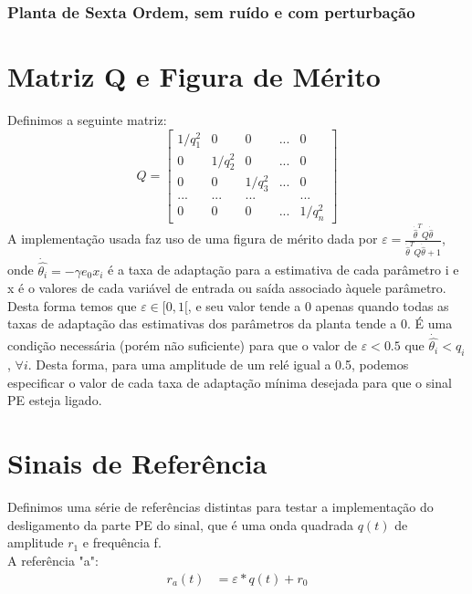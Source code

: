 \documentclass[
	12pt,				%
	openright,			%
	twoside,			%
	a4paper,			%
	english,			%
	french,				%
	spanish,			%
	brazil				%
	]{abntex2}
\begin{document}
\subsubsection{Planta de Sexta Ordem, sem ruído e com perturbação}

\section{Matriz Q e Figura de Mérito}

 Definimos a seguinte matriz: \[
Q=
  \begin{bmatrix}
    1/q_1^2 & 0       &  0       &  ... &  0      \\
    0       & 1/q_2^2 &  0       &  ... &  0      \\
    0       & 0       &  1/q_3^2 &  ... &  0      \\
    ...     & ...     &  ...     &      &  ...    \\
    0       & 0       &  0       &  ... & 1/q_n^2
  \end{bmatrix}
\]
A implementação usada faz uso de uma figura de mérito dada por $\varepsilon = \frac{\dot{\hat{\theta}}^TQ\dot{\hat{\theta}}}{\dot{\hat{\theta}}^TQ\dot{\hat{\theta}}+1}$, onde $\dot{\hat{\theta_i}} = -\gamma e_0 x_i$ é a taxa de adaptação para a estimativa de cada parâmetro i e x é o valores de cada variável de entrada ou saída associado àquele parâmetro. Desta forma temos que $\varepsilon \in [0,1[$, e seu valor tende a 0 apenas quando todas as taxas de adaptação das estimativas dos parâmetros da planta tende a 0. É uma condição necessária (porém não suficiente) para que o valor de $\varepsilon<0.5$ que $\dot{\hat{\theta_i}}<q_i$, $ \forall i$. Desta forma, para uma amplitude de um relé igual a 0.5, podemos especificar o valor de cada taxa de adaptação mínima desejada para que o sinal PE esteja ligado.\\

\section{Sinais de Referência}
 Definimos uma série de referências distintas para testar a implementação do desligamento da parte PE do sinal, que é uma onda quadrada $q(t)$ de amplitude $r_1$ e frequência f.\\

 A referência "a":  \begin{align*}
    r_a(t) &= \varepsilon*q(t) + r_0  \\
  \end{align*}  
   
\end{document}
